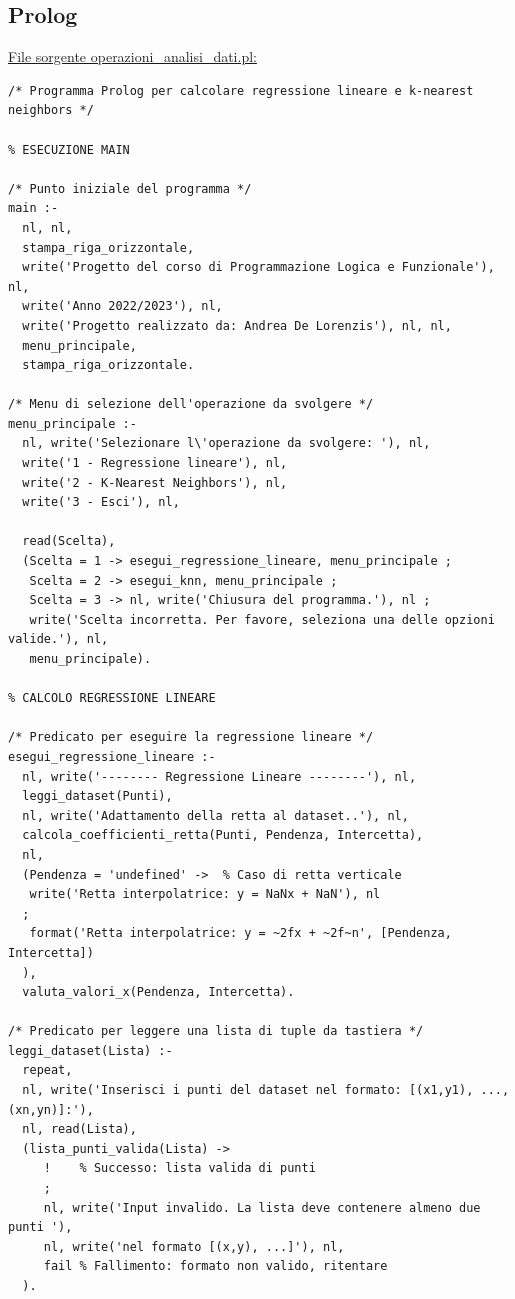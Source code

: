 \documentclass[11pt]{article}
\theoremstyle{definition}
\begin{document}
\subsection{Prolog}
\underline{File sorgente operazioni\_analisi\_dati.pl:}
\vspace{0.4cm}
\small
\begin{verbatim}
/* Programma Prolog per calcolare regressione lineare e k-nearest neighbors */

% ESECUZIONE MAIN

/* Punto iniziale del programma */
main :-
  nl, nl, 
  stampa_riga_orizzontale,
  write('Progetto del corso di Programmazione Logica e Funzionale'), nl,
  write('Anno 2022/2023'), nl,
  write('Progetto realizzato da: Andrea De Lorenzis'), nl, nl,
  menu_principale,
  stampa_riga_orizzontale.
  
/* Menu di selezione dell'operazione da svolgere */
menu_principale :-
  nl, write('Selezionare l\'operazione da svolgere: '), nl,
  write('1 - Regressione lineare'), nl,
  write('2 - K-Nearest Neighbors'), nl,
  write('3 - Esci'), nl,
  
  read(Scelta),
  (Scelta = 1 -> esegui_regressione_lineare, menu_principale ;
   Scelta = 2 -> esegui_knn, menu_principale ;
   Scelta = 3 -> nl, write('Chiusura del programma.'), nl ;
   write('Scelta incorretta. Per favore, seleziona una delle opzioni valide.'), nl,
   menu_principale). 

% CALCOLO REGRESSIONE LINEARE

/* Predicato per eseguire la regressione lineare */
esegui_regressione_lineare :-
  nl, write('-------- Regressione Lineare --------'), nl,
  leggi_dataset(Punti),
  nl, write('Adattamento della retta al dataset..'), nl,
  calcola_coefficienti_retta(Punti, Pendenza, Intercetta), 
  nl,
  (Pendenza = 'undefined' ->  % Caso di retta verticale
   write('Retta interpolatrice: y = NaNx + NaN'), nl
  ;
   format('Retta interpolatrice: y = ~2fx + ~2f~n', [Pendenza, Intercetta])
  ),
  valuta_valori_x(Pendenza, Intercetta).

/* Predicato per leggere una lista di tuple da tastiera */
leggi_dataset(Lista) :-
  repeat,
  nl, write('Inserisci i punti del dataset nel formato: [(x1,y1), ..., (xn,yn)]:'), 
  nl, read(Lista),
  (lista_punti_valida(Lista) ->
     !    % Successo: lista valida di punti
     ;
     nl, write('Input invalido. La lista deve contenere almeno due punti '),
     nl, write('nel formato [(x,y), ...]'), nl,
     fail % Fallimento: formato non valido, ritentare
  ).


\end{verbatim}
\end{document}
